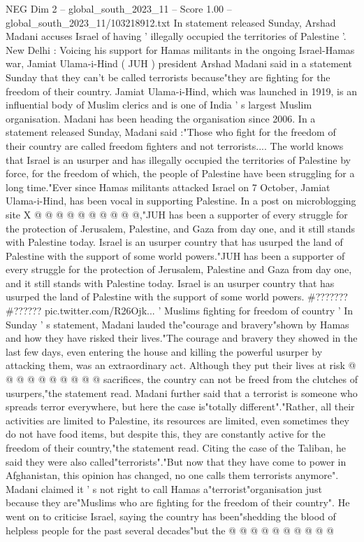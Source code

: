 \begin{textsample}{NEG Dim 2 – global\_south\_2023\_11 – Score 1.00 – global\_south\_2023\_11/103218912.txt}  \label{ex:f2_neg_354}
In statement released Sunday, Arshad Madani accuses Israel of having ' illegally occupied the territories of Palestine '.
New Delhi : Voicing his support for Hamas militants in the ongoing Israel-Hamas war, Jamiat Ulama-i-Hind ( JUH ) president Arshad Madani said in a statement Sunday that they can't be called terrorists because"they are fighting for the freedom of their country.
Jamiat Ulama-i-Hind, which was launched in 1919, is an influential body of Muslim clerics and is one of India ' s largest Muslim organisation.
Madani has been heading the organisation since 2006.
In a statement released Sunday, Madani said :"Those who fight for the freedom of their country are called freedom fighters and not terrorists....
The world knows that Israel is an usurper and has illegally occupied the territories of Palestine by force, for the freedom of which, the people of Palestine have been struggling for a long time."Ever since Hamas militants attacked Israel on 7 October, Jamiat Ulama-i-Hind, has been vocal in supporting Palestine.
In a post on microblogging site X @ @ @ @ @ @ @ @ @ @,"JUH has been a supporter of every struggle for the protection of Jerusalem, Palestine, and Gaza from day one, and it still stands with Palestine today.
Israel is an usurper country that has usurped the land of Palestine with the support of some world powers."JUH has been a supporter of every struggle for the protection of Jerusalem, Palestine and Gaza from day one, and it still stands with Palestine today.
Israel is an usurper country that has usurped the land of Palestine with the support of some world powers. \#??????? \#?????? pic.twitter.com/R26Ojk... ' Muslims fighting for freedom of country ' In Sunday ' s statement, Madani lauded the"courage and bravery"shown by Hamas and how they have risked their lives."The courage and bravery they showed in the last few days, even entering the house and killing the powerful usurper by attacking them, was an extraordinary act.
Although they put their lives at risk @ @ @ @ @ @ @ @ @ @ sacrifices, the country can not be freed from the clutches of usurpers,"the statement read.
Madani further said that a terrorist is someone who spreads terror everywhere, but here the case is"totally different"."Rather, all their activities are limited to Palestine, its resources are limited, even sometimes they do not have food items, but despite this, they are constantly active for the freedom of their country,"the statement read.
Citing the case of the Taliban, he said they were also called"terrorists"."But now that they have come to power in Afghanistan, this opinion has changed, no one calls them terrorists anymore".
Madani claimed it ' s not right to call Hamas a"terrorist"organisation just because they are"Muslims who are fighting for the freedom of their country".
He went on to criticise Israel, saying the country has been"shedding the blood of helpless people for the past several decades"but the @ @ @ @ @ @ @ @ @ @

\end{textsample}
